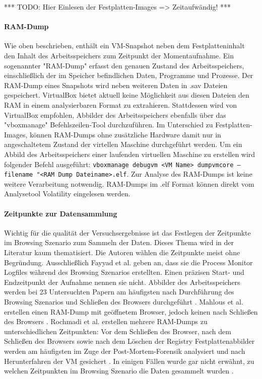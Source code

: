 *** TODO: Hier Einlesen der Festplatten-Images => Zeitaufwändig! ***

\paragraph*{RAM-Dump}

Wie oben beschrieben, enthält ein VM-Snapshot neben dem Festplatteninhalt den Inhalt des Arbeitsspeichers zum Zeitpunkt der Momentaufnahme.
Ein sogenannter "RAM-Dump" erfasst den genauen Zustand des Arbeitsspeichers, einschließlich der im Speicher befindlichen Daten, Programme und Prozesse.
Der RAM-Dump eines Snapshots wird neben weiteren Daten in .sav Dateien gespeichert. 
VirtualBox bietet aktuell keine Möglichkeit aus diesen Dateien den RAM in einem analysierbaren Format zu extrahieren.
Stattdessen wird von VirtualBox empfohlen, Abbilder des Arbeitsspeichers ebenfalls über das "vboxmanage" Befehlszeilen-Tool durchzuführen.
Im Unterschied zu Festplatten-Images, können RAM-Dumps ohne zusätzliche Hardware damit nur in angeschaltetem Zustand der virtellen Maschine durchgeführt werden. 
Um ein Abbild des Arbeitsspeichers einer laufenden virtuellen Maschine zu erstellen wird folgender Befehl ausgeführt: \texttt{vboxmanage debugvm <VM Name> dumpvmcore --filename "<RAM Dump Dateiname>.elf}. Zur Analyse des RAM-Dumps ist keine weitere Verarbeitung notwendig. RAM-Dumps im .elf Format können direkt vom Analysetool Volatility eingelesen werden.		

\paragraph*{Zeitpunkte zur Datensammlung}
Wichtig für die qualität der Versuchsergebnisse ist das Festlegen der Zeitpunkte im Browsing Szenario zum Sammeln der Daten.
Dieses Thema wird in der Literatur kaum thematisiert. Die Autoren wählen die Zeitpunkte meist ohne Begründung.
Ausschließlich Fayyad et al. geben an, dass sie die Process Monitor Logfiles während des Browsing Szenarios erstellten. Einen präzisen Start- und Endzeitpunkt der Aufnahme nennen sie nicht.
Abbilder des Arbeitsspeichers werden bei 23 Untersuchten Papern am häufigsten nach Durchführung des Browsing Szenarios und Schließen des Browsers durchgeführt \cite{Hariharan.2022, Izzati.2022, Md.2018, Ohana.2013}. Mahlous et al. erstellen einen RAM-Dump mit geöffnetem Browser, jedoch keinen nach Schließen des Browsers \cite{Mahlous.2020}.
Rochmadi et al. erstellen mehrere RAM-Dumps zu unterschiedlichen Zeitpunkten: Vor dem Schließen des Browser, nach dem Schließen des Browsers sowie nach dem Löschen der Registry \cite{Rochmadi.2017}
Festplattenabbilder werden am häufigsten im Zuge der Post-Mortem-Forensik analysiert und nach Herunterfahren der VM gesichert \cite{Fayyad.2021, Mahlous.2020, Horsman.2019, Md.2018, Gabet.2018, Montasari.2015, Chivers.2014, Ohana.2013}.
In einigen Fällen wurde gar nicht erwähnt, zu welchen Zeitpunkten im Browsing Szenario die Daten gesammelt wurden \cite{Sajan.2021, Nalawade.2016, Montasari.2015, Satvat.2014, Said.2011, Aggarwal.2010}.

